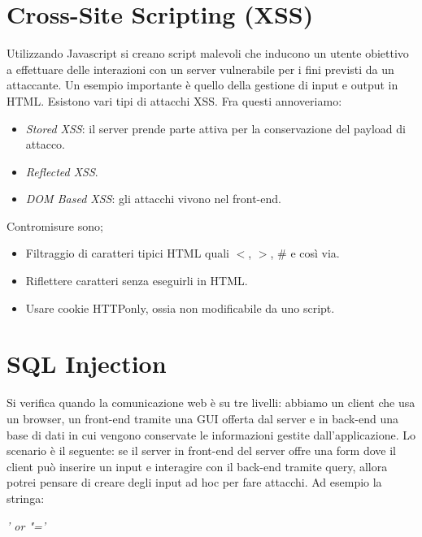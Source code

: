 \documentclass[14pt]{extreport}
\begin{document}
\section{Cross-Site Scripting (XSS)}
Utilizzando Javascript si creano script malevoli che inducono un utente obiettivo a effettuare delle interazioni con un server vulnerabile per i fini previsti da un attaccante.
Un esempio importante è quello della gestione di input e output in HTML.
Esistono vari tipi di attacchi XSS. Fra questi annoveriamo:


\begin{itemize}
    \item \textit{Stored XSS}: il server prende parte attiva per la conservazione del payload di attacco.
    
    \item \textit{Reflected XSS}.
    
    \item \textit{DOM Based XSS}: gli attacchi vivono nel front-end.
\end{itemize}

Contromisure sono;

\begin{itemize}
    \item Filtraggio di caratteri tipici HTML quali $<$, $>$, \# e così via.
    
    
    \item Riflettere caratteri senza eseguirli in HTML.
    
    \item Usare cookie HTTPonly, ossia non modificabile da uno script.
\end{itemize}


\section{SQL Injection}
Si verifica quando la comunicazione web è su tre livelli: abbiamo un client che usa un browser, un front-end tramite una GUI offerta dal server e in back-end una base di dati in cui vengono conservate le informazioni gestite dall'applicazione.
Lo scenario è il seguente: se il server in front-end del server offre una form dove il client può inserire un input e interagire con il back-end tramite query, allora potrei pensare di creare degli input ad hoc per fare attacchi.
Ad esempio la stringa:

\begin{center}
    \textit{' or "='}
\end{center}
\end{document}

